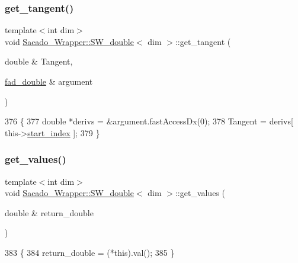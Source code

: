 \subsubsection{\texorpdfstring{get\+\_\+tangent()}{get\_tangent()}\hspace{0.1cm}{\footnotesize\ttfamily [2/2]}}
{\footnotesize\ttfamily template$<$int dim$>$ \\
void \hyperlink{classSacado__Wrapper_1_1SW__double}{Sacado\+\_\+\+Wrapper\+::\+S\+W\+\_\+double}$<$ dim $>$\+::get\+\_\+tangent (\begin{DoxyParamCaption}\item[{double \&}]{Tangent,  }\item[{\hyperlink{Sacado__example_8cc_a868b94676739e612d9c95940e70892a9}{fad\+\_\+double} \&}]{argument }\end{DoxyParamCaption})}


\begin{DoxyCode}
376     \{
377          \textcolor{keywordtype}{double} *derivs = &argument.fastAccessDx(0);
378          Tangent = derivs[ this->\hyperlink{classSacado__Wrapper_1_1SW__double_aa0927ce06528899dd44afe5d770840c1}{start\_index} ];
379     \}
\end{DoxyCode}
\mbox{\label{classSacado__Wrapper_1_1SW__double_ae7e9f33604ea736e485576447d78a46c}} 
\subsubsection{\texorpdfstring{get\+\_\+values()}{get\_values()}}
{\footnotesize\ttfamily template$<$int dim$>$ \\
void \hyperlink{classSacado__Wrapper_1_1SW__double}{Sacado\+\_\+\+Wrapper\+::\+S\+W\+\_\+double}$<$ dim $>$\+::get\+\_\+values (\begin{DoxyParamCaption}\item[{double \&}]{return\+\_\+double }\end{DoxyParamCaption})}


\begin{DoxyCode}
383     \{
384         return\_double = (*this).val();
385     \}
\end{DoxyCode}
\mbox{\label{classSacado__Wrapper_1_1SW__double_adca799dd92dadebda9aebc91c797682a}} 
